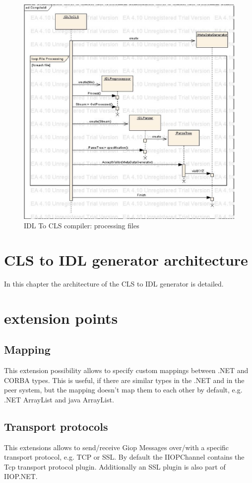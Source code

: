 \documentclass[a4paper]{report}
\begin{document}
\begin{figure}[h]
\begin{center}
\includegraphics[width=440pt]{IdlCompilerBehaviour.eps}
\end{center}
\caption{\label{IDLCompilerBehaviour} IDL To CLS compiler: processing files}
\end{figure}

\newpage
\section{CLS to IDL generator architecture}
In this chapter the architecture of the CLS to IDL generator is detailed.

\section{extension points}
\subsection{Mapping}
This extension possibility allows to specify custom mappings between .NET and CORBA types.
This is useful, if there are similar types in the .NET and in the peer system, but the
mapping doesn't map them to each other by default, e.g. .NET ArrayList and java ArrayList.

\subsection{Transport protocols}
This extensions allows to send/receive Giop Messages over/with a specific transport protocol, e.g.
TCP or SSL. By default the IIOPChannel contains the Tcp transport protocol plugin. Additionally an
SSL plugin is also part of IIOP.NET.
\end{document}
